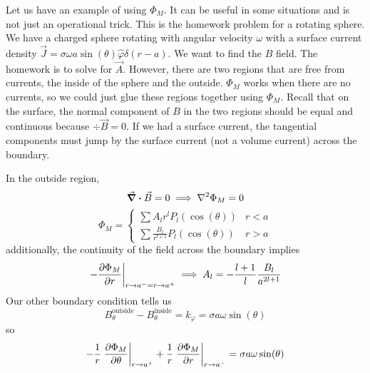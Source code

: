 \documentclass[a4paper,twoside,master.tex]{subfiles}
\begin{document}
\begin{ex}
    Let us have an example of using $ \Phi_M $. It can be useful in some situations and is not just an operational trick. This is the homework problem for a rotating sphere. We have a charged sphere rotating with angular velocity $ \omega $ with a surface current density $ \vec{J} = \sigma \omega a \sin(\theta) \hat{\varphi} \delta(r-a) $. We want to find the $ B $ field. The homework is to solve for $ \vec{A} $. However, there are two regions that are free from currents, the inside of the sphere and the outside. $ \Phi_M $ works when there are no currents, so we could just glue these regions together using $ \Phi_M $. Recall that on the surface, the normal component of $ B $ in the two regions should be equal and continuous because $ \div{ \vec{B}} = 0 $. If we had a surface current, the tangential components must jump by the surface current (not a volume current) across the boundary.

    In the outside region,
    \begin{equation}
        \div{ \vec{B}} = 0 \implies \laplacian{\Phi_M} = 0
    \end{equation}
    \begin{equation}
        \Phi_M = \begin{cases}
            \sum A_l r^l P_l(\cos(\theta)) & r<a\\
            \sum \frac{B_l}{r^{l+1}} P_l(\cos(\theta)) & r>a
        \end{cases}
    \end{equation}
    additionally, the continuity of the field across the boundary implies
    \begin{equation}
        \eval{- \pdv{\Phi_M}{r}}_{r \to a^- = r \to a^+} \implies A_l = - \frac{l+1}{l} \frac{B_l}{a^{2l+1}}
    \end{equation}
    Our other boundary condition tells us
    \begin{equation}
        B_\theta^{\text{outside}} - B_\theta^{\text{inside}} = k_{\varphi} = \sigma a \omega \sin(\theta)
    \end{equation}
    so
    \begin{equation}
        - \frac{1}{r} \eval{\pdv{\Phi_M}{\theta}}_{r \to a^+} + \frac{1}{r} \eval{\pdv{\Phi_M}{r}}_{r \to a^-} = \sigma a \omega \sin(\theta)
    \end{equation}
\end{ex}
\end{document}
